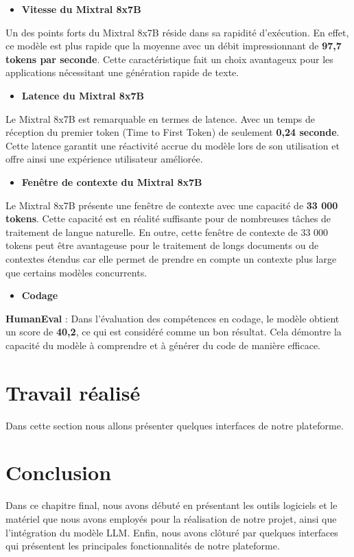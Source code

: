 \begin{itemize}
    \item \textbf{Vitesse du Mixtral 8x7B}
\end{itemize}
\noindent Un des points forts du Mixtral 8x7B réside dans sa rapidité d'exécution. En effet, ce modèle est plus rapide que la moyenne avec un débit impressionnant de \textbf{97,7 tokens par seconde}. Cette caractéristique fait un choix avantageux pour les applications nécessitant une génération rapide de texte.

\begin{itemize}
    \item \textbf{Latence du Mixtral 8x7B }
\end{itemize}
\noindent Le Mixtral 8x7B est remarquable en termes de latence. Avec un temps de réception du premier token (Time to First Token) de seulement \textbf{0,24 seconde}. Cette latence garantit une réactivité accrue du modèle lors de son utilisation et offre ainsi une expérience utilisateur améliorée.

\begin{itemize}
    \item \textbf{Fenêtre de contexte du Mixtral 8x7B }
\end{itemize}
\noindent Le Mixtral 8x7B présente une fenêtre de contexte avec une capacité de \textbf{33 000 tokens}. Cette capacité est en réalité suffisante pour de nombreuses tâches de traitement de langue naturelle. En outre, cette fenêtre de contexte de 33 000 tokens peut être avantageuse pour le traitement de longs documents ou de contextes étendus car elle permet de prendre en compte un contexte plus large que certains modèles concurrents.

\begin{itemize}
    \item \textbf{Codage }
\end{itemize}
\noindent \textbf{HumanEval} : Dans l'évaluation des compétences en codage, le modèle obtient un score de \textbf{40,2}, ce qui est considéré comme un bon résultat. Cela démontre la capacité du modèle à comprendre et à générer du code de manière efficace. \cite{codage}

\section{Travail réalisé }
Dans cette section nous allons présenter quelques interfaces de notre plateforme.

\section*{Conclusion}
Dans ce chapitre final, nous avons débuté en présentant les outils logiciels et le matériel que nous avons employés pour la réalisation de notre projet, ainsi que l'intégration du modèle LLM. Enfin, nous avons clôturé par quelques interfaces qui présentent les principales fonctionnalités de notre plateforme.

